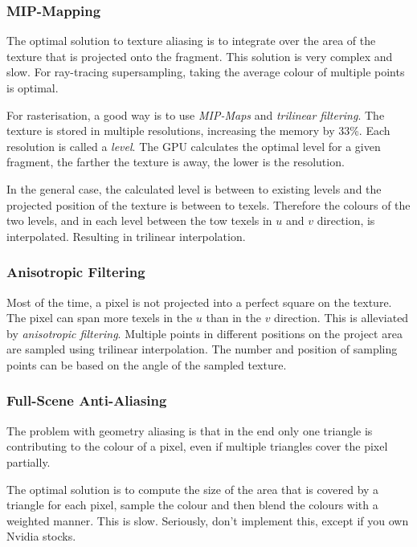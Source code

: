 \documentclass{panikzettel}
\begin{document}
\subsubsection*{MIP-Mapping}

The optimal solution to texture aliasing is to integrate over the area of the texture that is projected onto the fragment. This solution is very complex and slow. For ray-tracing supersampling, taking the average colour of multiple points is optimal.

For rasterisation, a good way is to use \emph{MIP-Maps} and \emph{trilinear filtering}. The texture is stored in multiple resolutions, increasing the memory by 33\%. Each resolution is called a \emph{level}. The GPU calculates the optimal level for a given fragment, the farther the texture is away, the lower is the resolution.

In the general case, the calculated level is between to existing levels and the projected position of the texture is between to texels. Therefore the colours of the two levels, and in each level between the tow texels in $u$ and $v$ direction, is interpolated. Resulting in trilinear interpolation.

\subsubsection*{Anisotropic Filtering}

Most of the time, a pixel is not projected into a perfect square on the texture. The pixel can span more texels in the $u$ than in the $v$ direction. This is alleviated by \emph{anisotropic filtering}. Multiple points in different positions on the project area are sampled using trilinear interpolation. The number and position of sampling points can be based on the angle of the sampled texture.

\subsubsection*{Full-Scene Anti-Aliasing}

The problem with geometry aliasing is that in the end only one triangle is contributing to the colour of a pixel, even if multiple triangles cover the pixel partially.

The optimal solution is to compute the size of the area that is covered by a triangle for each pixel, sample the colour and then blend the colours with a weighted manner. This is slow. Seriously, don't implement this, except if you own Nvidia stocks.
\end{document}
